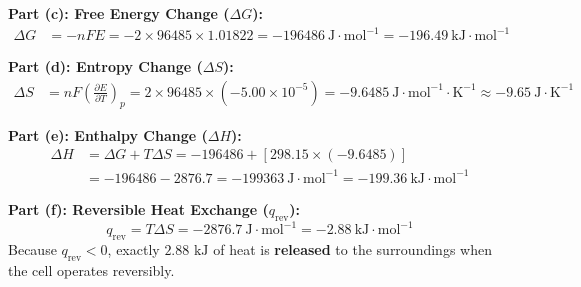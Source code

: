 \begin{examplebox}
\textbf{Part (c): Free Energy Change ($\Delta G$):}
\begin{align*}
    \Delta G &= -nFE = -2 \times 96485 \times 1.01822 = -196486\ \text{J}\cdot\text{mol}^{-1} = -196.49\ \text{kJ}\cdot\text{mol}^{-1}
\end{align*}

\textbf{Part (d): Entropy Change ($\Delta S$):}
\begin{align*}
    \Delta S &= n F \left(\frac{\partial E}{\partial T}\right)_p = 2 \times 96485 \times (-5.00 \times 10^{-5}) = -9.6485\ \text{J}\cdot\text{mol}^{-1}\cdot\text{K}^{-1} \approx -9.65\ \text{J}\cdot\text{K}^{-1}
\end{align*}

\textbf{Part (e): Enthalpy Change ($\Delta H$):}
\begin{align*}
    \Delta H &= \Delta G + T \Delta S = -196486 + [298.15 \times (-9.6485)] \\
    &= -196486 - 2876.7 = -199363\ \text{J}\cdot\text{mol}^{-1} = -199.36\ \text{kJ}\cdot\text{mol}^{-1}
\end{align*}

\textbf{Part (f): Reversible Heat Exchange ($q_{\text{rev}}$):}
\begin{equation*}
    q_{\text{rev}} = T \Delta S = -2876.7\ \text{J}\cdot\text{mol}^{-1} = -2.88\ \text{kJ}\cdot\text{mol}^{-1}
\end{equation*}
Because $q_{\text{rev}} < 0$, exactly $2.88\text{ kJ}$ of heat is \textbf{released} to the surroundings when the cell operates reversibly.
\end{examplebox}
